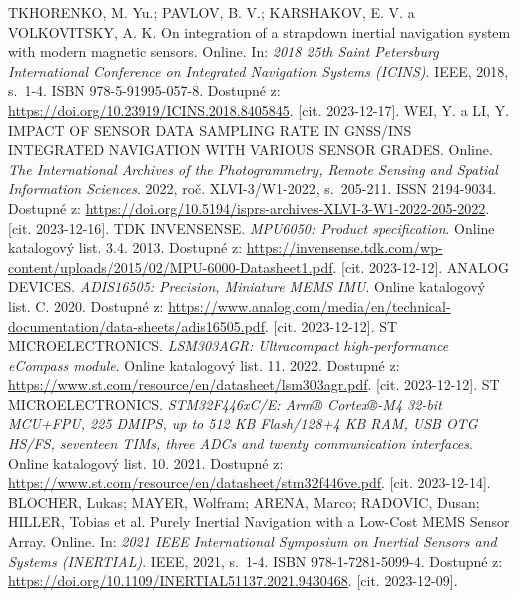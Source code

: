 \begin{thebibliography}{29}
TKHORENKO, M. Yu.; PAVLOV, B. V.; KARSHAKOV, E. V. a VOLKOVITSKY, A. K. On integration of a strapdown inertial navigation system with modern magnetic sensors. Online. In: \textit{2018 25th Saint Petersburg International Conference on Integrated Navigation Systems (ICINS)}. IEEE, 2018, s.~1-4. ISBN 978-5-91995-057-8. Dostupné z: \url{https://doi.org/10.23919/ICINS.2018.8405845}. [cit. 2023-12-17].
WEI, Y. a LI, Y. IMPACT OF SENSOR DATA SAMPLING RATE IN GNSS/INS INTEGRATED NAVIGATION WITH VARIOUS SENSOR GRADES. Online. \textit{The International Archives of the Photogrammetry, Remote Sensing and Spatial Information Sciences}. 2022, roč. XLVI-3/W1-2022, s.~205-211. ISSN 2194-9034. Dostupné z: \url{https://doi.org/10.5194/isprs-archives-XLVI-3-W1-2022-205-2022}. [cit. 2023-12-16].
TDK INVENSENSE. \textit{MPU6050: Product specification}. Online katalogový list. 3.4. 2013. Dostupné z: \url{https://invensense.tdk.com/wp-content/uploads/2015/02/MPU-6000-Datasheet1.pdf}. [cit. 2023-12-12].
ANALOG DEVICES. \textit{ADIS16505: Precision, Miniature MEMS IMU}. Online katalogový list. C. 2020. Dostupné z: \url{https://www.analog.com/media/en/technical-documentation/data-sheets/adis16505.pdf}. [cit. 2023-12-12].
ST MICROELECTRONICS. \textit{LSM303AGR: Ultracompact high-performance eCompass module}. Online katalogový list. 11. 2022. Dostupné z: \url{https://www.st.com/resource/en/datasheet/lsm303agr.pdf}. [cit. 2023-12-12].
ST MICROELECTRONICS. \textit{STM32F446xC/E: Arm® Cortex®-M4 32-bit MCU+FPU, 225 DMIPS, up to 512 KB Flash/128+4 KB RAM, USB OTG HS/FS, seventeen TIMs, three ADCs and twenty communication interfaces}. Online katalogový list. 10. 2021. Dostupné z: \url{https://www.st.com/resource/en/datasheet/stm32f446ve.pdf}. [cit. 2023-12-14].
BLOCHER, Lukas; MAYER, Wolfram; ARENA, Marco; RADOVIC, Dusan; HILLER, Tobias et al. Purely Inertial Navigation with a Low-Cost MEMS Sensor Array. Online. In: \textit{2021 IEEE International Symposium on Inertial Sensors and Systems (INERTIAL)}. IEEE, 2021, s.~1-4. ISBN 978-1-7281-5099-4. Dostupné z: \url{https://doi.org/10.1109/INERTIAL51137.2021.9430468}. [cit. 2023-12-09].

\end{thebibliography}